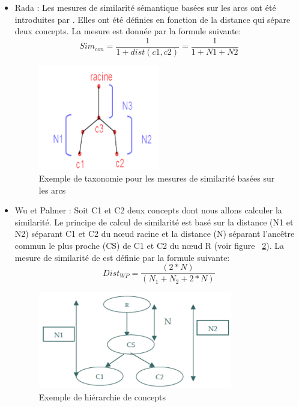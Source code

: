 \documentclass[a4paper,12pt,letterpaper,headsepline,singlespacing,headsepline, french]{report}
\begin{document}
	\begin{itemize} 
	\item Rada : Les mesures de similarité sémantique basées sur les arcs ont été introduites par \cite{ref15}. Elles ont été définies en fonction de la distance qui sépare deux concepts. La mesure est donnée par la formule suivante:
	\begin{equation}
	Sim_{con}= \frac{1}{1 + dist(c1, c2)}  = \frac{1}{1 + N1 + N2} 
	\end{equation}
		\begin{figure}[H]
		\centering
		\includegraphics[width=0.5\textwidth]{rada.PNG}
		\caption{Exemple de taxonomie pour les mesures de similarité basées sur les arcs}
		\label{fig:rada}
	\end{figure}

	\item Wu et Palmer : Soit C1 et C2 deux concepts dont nous allons calculer la similarité. Le principe de calcul de similarité est basé sur la distance (N1 et N2) séparant C1 et C2 du nœud racine et la distance (N) séparant l'ancêtre commun le plus proche (CS) de C1 et C2 du nœud R (voir figure ~\ref{fig:wupalm}). La mesure de similarité de \cite{ref37} est définie par la formule suivante:
	\begin{equation}\label{key6}
	Dist_{WP}= \frac{ (2*N)}{(N_{1}+N_{2}+2*N)}  
	\end{equation}
		\begin{figure}[H]
			\centering
			\includegraphics[width=0.8\textwidth]{wupal.PNG}
			\caption{Exemple de hiérarchie de concepts \cite{ref38}}
			\label{fig:wupalm}
		\end{figure}
	
		
	\end{itemize}
\end{document}
